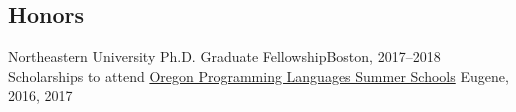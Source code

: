 \documentclass[margin,line]{resume}
\begin{document}
\begin{resume}
    

    \renewcommand\mymedskip{3pt}




    \section{\mysidestyle Honors} 

    Northeastern University Ph.D. Graduate Fellowship\hfill Boston, 2017--2018\\[\mymedskip]
    Scholarships to attend
    \href{https://www.cs.uoregon.edu/research/summerschool/summer17}
    {Oregon Programming Languages Summer Schools} \hfill %
    Eugene, 2016, 2017



\end{resume}
\end{document}
